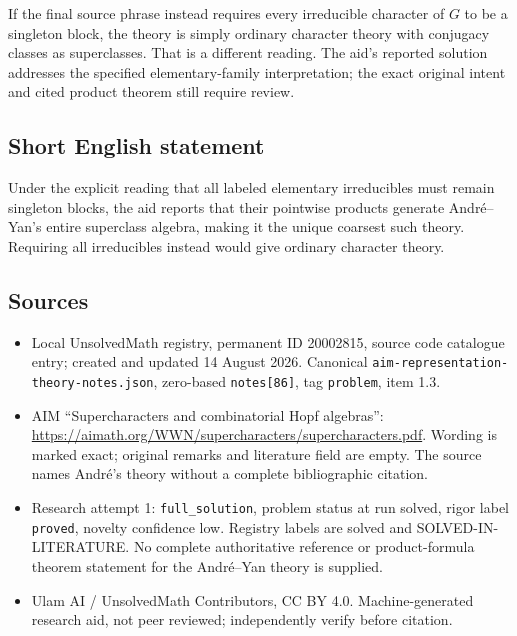 \documentclass[11pt]{article}
\begin{document}
If the final source phrase instead requires every irreducible character of $G$ to be a singleton block, the theory is simply ordinary character theory with conjugacy classes as superclasses. That is a different reading. The aid's reported solution addresses the specified elementary-family interpretation; the exact original intent and cited product theorem still require review.
\subsection{Short English statement}
Under the explicit reading that all labeled elementary irreducibles must remain singleton blocks, the aid reports that their pointwise products generate Andr\'e--Yan's entire superclass algebra, making it the unique coarsest such theory. Requiring all irreducibles instead would give ordinary character theory.
\subsection{Sources}
\begin{itemize}
\item Local UnsolvedMath registry, permanent ID 20002815, source code catalogue entry; created and updated 14 August 2026. Canonical \texttt{aim-representation-theory-notes.json}, zero-based \texttt{notes[86]}, tag \texttt{problem}, item 1.3.
\item AIM ``Supercharacters and combinatorial Hopf algebras'': \url{https://aimath.org/WWN/supercharacters/supercharacters.pdf}. Wording is marked exact; original remarks and literature field are empty. The source names Andr\'e's theory without a complete bibliographic citation.
\item Research attempt 1: \texttt{full\_solution}, problem status at run solved, rigor label \texttt{proved}, novelty confidence low. Registry labels are solved and SOLVED-IN-LITERATURE. No complete authoritative reference or product-formula theorem statement for the Andr\'e--Yan theory is supplied.
\item Ulam AI / UnsolvedMath Contributors, CC BY 4.0. Machine-generated research aid, not peer reviewed; independently verify before citation.
\end{itemize}
\end{document}
